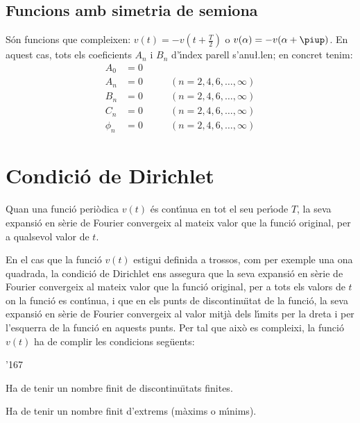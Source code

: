 \subsection{Funcions amb simetria de semiona}

S\'{o}n funcions que compleixen: $v(t) = -v(t+\frac{T}{2})$ o $v(\alpha) = -v(\alpha+\piup)$. En aquest
cas, tots els coeficients $A_n$ i $B_n$ d'\'{\i}ndex parell s'anu{\l.l}en;
en concret tenim:
\begin{subequations}
\begin{alignat}{2}
    A_0 &= 0       & \\[0.5ex]
    A_n &= 0       &\qquad (n = 2,4,6,\ldots,\infty)\\[0.5ex]
    B_n &= 0       &\qquad (n = 2,4,6,\ldots,\infty)\\[0.5ex]
    C_n &= 0       &\qquad (n = 2,4,6,\ldots,\infty)\\[0.5ex]
    \phi_n &= 0 &\qquad (n = 2,4,6,\ldots,\infty)
\end{alignat}
\end{subequations}

\section{Condici\'{o} de Dirichlet}

Quan una funci\'{o} peri\`{o}dica $v(t)$  \'{e}s cont\'{\i}nua en tot el seu per\'{\i}ode
$T$, la seva expansi\'{o} en s\`{e}rie de Fourier convergeix al mateix valor
que la funci\'{o} original, per a qualsevol valor de $t$.

En el cas que la funci\'{o} $v(t)$ estigui definida a trossos, com per
exemple una ona quadrada, la condici\'{o} de Dirichlet ens assegura que
la seva expansi\'{o} en s\`{e}rie de Fourier convergeix al mateix valor que
la funci\'{o} original, per a tots els valors de $t$ on la funci\'{o} es
cont\'{\i}nua, i que en els punts de discontinu\"{\i}tat de la funci\'{o}, la seva
expansi\'{o} en s\`{e}rie de Fourier convergeix al valor mitj\`{a} dels l\'{\i}mits
per la dreta i per l'esquerra de la funci\'{o} en aquests punts. Per tal
que aix\`{o} es compleixi, la funci\'{o} $v(t)$ ha de complir les condicions
seg\"{u}ents:
\begin{dinglist}{'167}
   \item Ha de tenir un nombre finit de discontinu\"{\i}tats
   finites.
   \item Ha de tenir un nombre finit d'extrems (m\`{a}xims o m\'{\i}nims).
\end{dinglist}

